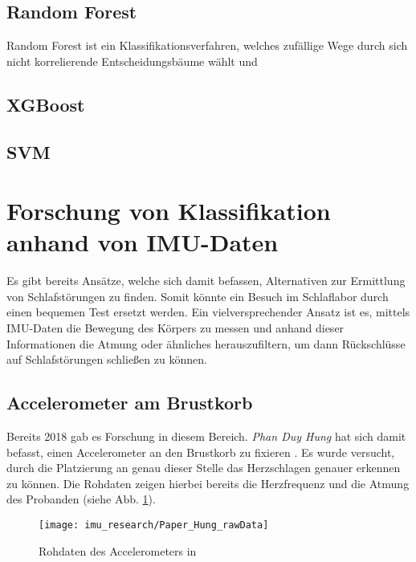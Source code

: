 \subsection{Random Forest}
Random Forest ist ein Klassifikationsverfahren, welches zufällige Wege durch sich nicht korrelierende Entscheidungsbäume wählt und 

\subsection{XGBoost}

\subsection{SVM}


\section{Forschung von Klassifikation anhand von IMU-Daten}
Es gibt bereits Ansätze, welche sich damit befassen, Alternativen zur Ermittlung von Schlafstörungen zu finden. 
Somit könnte ein Besuch im Schlaflabor durch einen bequemen Test ersetzt werden. 
Ein vielversprechender Ansatz ist es, mittels IMU-Daten die Bewegung des Körpers zu messen und anhand dieser Informationen die Atmung oder ähnliches herauszufiltern, um dann Rückschlüsse auf Schlafstörungen schließen zu können.

\subsection{Accelerometer am Brustkorb}
Bereits 2018 gab es Forschung in diesem Bereich. \textit{Phan Duy Hung} hat sich damit befasst, einen Accelerometer an den Brustkorb zu fixieren \cite{hung_central_2018}.
Es wurde versucht, durch die Platzierung an genau dieser Stelle das Herzschlagen genauer erkennen zu können. 
Die Rohdaten zeigen hierbei bereits die Herzfrequenz und die Atmung des Probanden (siehe Abb. \ref{imu_research_hung_rawData}).

\begin{figure}[ht]
    \centering
    \texttt{[image: imu\_research/Paper\_Hung\_rawData]}
    \caption{Rohdaten des Accelerometers in \cite{hung_central_2018}}
    \label{imu_research_hung_rawData}
\end{figure}

